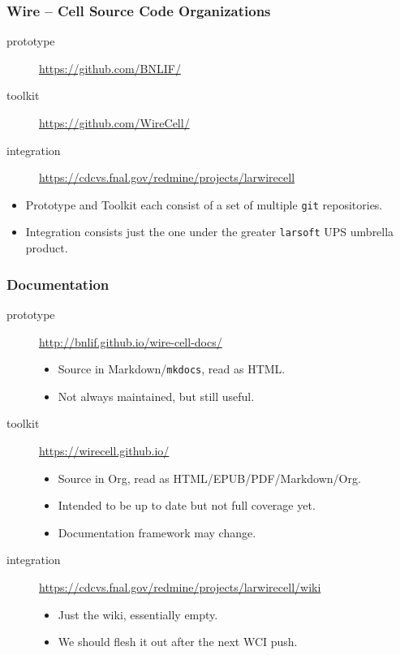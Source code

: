 \documentclass[xcolor=dvipsnames]{beamer}
\def\wc{Wire -- Cell\xspace}
\begin{document}
\begin{frame}
  \frametitle{\wc Source Code Organizations}

  \begin{description}
  \item[prototype] \url{https://github.com/BNLIF/}
  \item[toolkit] \url{https://github.com/WireCell/}
  \item[integration] \url{https://cdcvs.fnal.gov/redmine/projects/larwirecell}
  \end{description}

  \footnotesize

  \begin{itemize}
  \item Prototype and Toolkit each consist of a set of multiple
    \texttt{git} repositories.

  \item Integration consists just the one under the greater
    \texttt{larsoft} UPS umbrella product.
  \end{itemize}
\end{frame}

\begin{frame}
  \frametitle{Documentation}
  \begin{description}
  \item[prototype] \url{http://bnlif.github.io/wire-cell-docs/}
    \begin{itemize}\footnotesize
    \item Source in Markdown/\texttt{mkdocs}, read as HTML.
    \item Not always maintained, but still useful.
    \end{itemize}
  \item[toolkit] \url{https://wirecell.github.io/}
    \begin{itemize}\footnotesize
    \item Source in Org, read as HTML/EPUB/PDF/Markdown/Org.
    \item Intended to be up to date but not full coverage yet.
    \item Documentation framework may change.
    \end{itemize}
  \item[integration] \url{https://cdcvs.fnal.gov/redmine/projects/larwirecell/wiki}
    \begin{itemize}\footnotesize
    \item Just the wiki, essentially empty.
    \item We should flesh it out after the next WCI push.
    \end{itemize}
  \end{description}
\end{frame}
\end{document}
